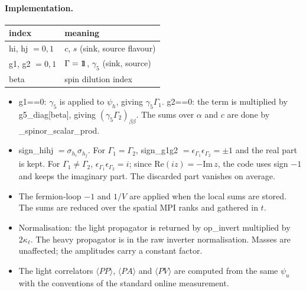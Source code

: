 \paragraph{Implementation.}
\begin{center}
\begin{tabular}{ll}
  \hline
  index & meaning \\
  \hline
  {\ttfamily hi}, {\ttfamily hj} $=0,1$ & $c$, $s$ \quad (sink, source flavour) \\
  {\ttfamily g1}, {\ttfamily g2} $=0,1$ & $\Gamma=1\!\!1$, $\gamma_5$ \quad (sink, source) \\
  {\ttfamily beta} & spin dilution index \\
  \hline
\end{tabular}
\end{center}

\begin{itemize}
  \item {\ttfamily g1==0}: $\gamma_5$ is applied to $\psi_h$, giving $\gamma_5\Gamma_1$.
        {\ttfamily g2==0}: the term is multiplied by {\ttfamily g5\_diag[beta]}, giving $(\gamma_5\Gamma_2)_{\beta\beta}$.
        The sums over $\alpha$ and $c$ are done by {\ttfamily \_spinor\_scalar\_prod}.
  \item {\ttfamily sign\_hihj} $=\sigma_{h_i}\sigma_{h_j}$.
        For $\Gamma_1=\Gamma_2$, {\ttfamily sign\_g1g2} $=\epsilon_{\Gamma_1}\epsilon_{\Gamma_2}=\pm1$ and the real part is kept.
        For $\Gamma_1\neq\Gamma_2$, $\epsilon_{\Gamma_1}\epsilon_{\Gamma_2}=i$; since $\mathrm{Re}(iz)=-\mathrm{Im}\,z$,
        the code uses sign $-1$ and keeps the imaginary part.
        The discarded part vanishes on average.
  \item The fermion-loop $-1$ and $1/V$ are applied when the local sums are stored. The sums are reduced over
        the spatial MPI ranks and gathered in $t$.
  \item Normalisation: the light propagator is returned by {\ttfamily op\_invert} multiplied by $2\kappa_\ell$.
        The heavy propagator is in the raw inverter normalisation.
        Masses are unaffected; the amplitudes carry a constant factor.
  \item The light correlators $\langle PP\rangle$, $\langle PA\rangle$ and $\langle PV\rangle$ are computed from the same $\psi_u$
        with the conventions of the standard online measurement.
\end{itemize}
\endgroup

